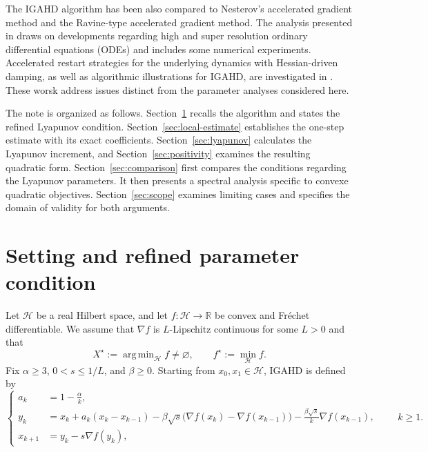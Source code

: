 \documentclass[11pt]{article}
\theoremstyle{plain}
\theoremstyle{definition}
\newcommand{\R}{\mathbb{R}}
\newcommand{\Hc}{\mathcal H}
\newcommand{\IGAHD}{\textup{IGAHD}\xspace}
\DeclareMathOperator*{\argminop}{arg\,min}
\begin{document}
The IGAHD algorithm has been also compared to Nesterov's accelerated gradient method and the Ravine-type accelerated gradient method. The analysis presented in \cite{AAF2024} draws on developments regarding high and super resolution ordinary differential equations (ODEs) and includes some numerical experiments. Accelerated restart strategies for the underlying dynamics with Hessian-driven damping, as well as algorithmic illustrations for IGAHD, are investigated in \cite{MaulenPeypouquet2023}. These worsk address issues distinct from the parameter analyses considered here.

The note is organized as follows. Section~\ref{sec:setting} recalls the algorithm and states the refined Lyapunov condition. Section~\ref{sec:local-estimate} establishes the one-step estimate with its exact coefficients. Section~\ref{sec:lyapunov} calculates the Lyapunov increment, and Section~\ref{sec:positivity} examines the resulting quadratic form.
Section~\ref{sec:comparison} first compares the conditions regarding the Lyapunov parameters. It then presents a spectral analysis specific to convexe quadratic objectives.
Section~\ref{sec:scope} examines limiting cases and specifies the domain of validity for both arguments.
\section{Setting and refined parameter condition}\label{sec:setting}
Let $\Hc$ be a real Hilbert space, and let $f:\Hc\to\R$ be convex and
Fr\'echet differentiable. We assume that $\nabla f$ is $L$-Lipschitz
continuous for some $L>0$ and that
$$
X^\star:=\argminop_{\Hc}f\neq\varnothing,
\qquad
f^\star:=\min_{\Hc}f.
$$
Fix $\alpha\geq3$, $0<s\leq1/L$, and $\beta\geq0$. Starting from
$x_0,x_1\in\Hc$, \IGAHD is defined by
\begin{equation}
\label{eq:igahd}
\left\{
\begin{aligned}
a_k&=1-\frac{\alpha}{k},\\
y_k&=x_k+a_k(x_k-x_{k-1})
-\beta\sqrt{s}\bigl(\nabla f(x_k)-\nabla f(x_{k-1})\bigr)
-\frac{\beta\sqrt{s}}{k}\nabla f(x_{k-1}),\\
x_{k+1}&=y_k-s\nabla f(y_k),
\end{aligned}
\right.
\qquad k\geq1.
\end{equation}
\end{document}
